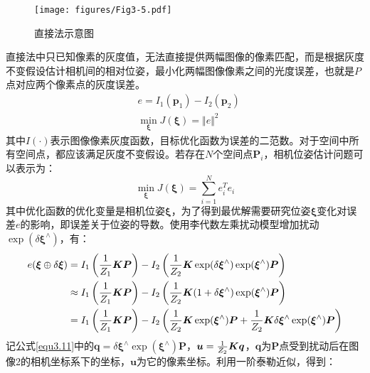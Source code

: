 \begin{figure}
\centering
\texttt{[image: figures/Fig3-5.pdf]}
\caption{直接法示意图}
\label{fig3.5}
\end{figure}

直接法中只已知像素的灰度值，无法直接提供两幅图像的像素匹配，而是根据灰度不变假设估计相机间的相对位姿，最小化两幅图像像素之间的光度误差，也就是$P$点对应两个像素点的灰度误差。
\begin{equation}
\label{equ3.9}
\begin{aligned}
& e = I_1(\boldsymbol{p}_1) - I_2(\boldsymbol{p}_2) 
\\ 
& \min\limits_{\boldsymbol{\xi}} J(\boldsymbol{\xi}) = \Vert e \Vert ^2
\end{aligned}
\end{equation}
其中$I(\cdot)$表示图像像素灰度函数，目标优化函数为误差的二范数。对于空间中所有空间点，都应该满足灰度不变假设。若存在$N$个空间点$\boldsymbol{P}_i$，相机位姿估计问题可以表示为：
\begin{equation}
\label{equ3.10}
\min\limits_{\boldsymbol{\xi}} J(\boldsymbol{\xi}) = \sum\limits_{i=1}^N e_i^T e_i
\end{equation}
其中优化函数的优化变量是相机位姿$\boldsymbol{\xi}$，为了得到最优解需要研究位姿$\boldsymbol{\xi}$变化对误差$e$的影响，即误差关于位姿的导数。使用李代数左乘扰动模型增加扰动$\exp( \delta \boldsymbol{\xi}^{\wedge})$，有：
\begin{equation}
\label{equ3.11}
\begin{aligned}
e(\boldsymbol{\xi}\oplus \delta \boldsymbol{\xi}) & = I_1\left({1 \over Z_1} \boldsymbol{K} \boldsymbol{P} \right) - I_2\left({1 \over Z_2} \boldsymbol{K} \exp (\delta \boldsymbol{\xi}^{\wedge}) \exp (\boldsymbol{\xi}^{\wedge}) \boldsymbol{P} \right)
\\
& \approx I_1\left( {1 \over Z_1} \boldsymbol{K} \boldsymbol{P} \right) - I_2 \left( {1 \over Z_2} \boldsymbol{K} (1+\delta \boldsymbol{\xi}^{\wedge}) \exp (\boldsymbol{\xi}^{\wedge}) \boldsymbol{P} \right)
\\
& = I_1\left( {1 \over Z_1} \boldsymbol{K} \boldsymbol{P} \right) - I_2 \left({1 \over Z_2} \boldsymbol{K} \exp (\boldsymbol{\xi}^{\wedge}) \boldsymbol{P}+ {1 \over Z_2} \boldsymbol{K} \delta \boldsymbol{\xi}^{\wedge} \exp (\boldsymbol{\xi}^{\wedge}) \boldsymbol{P} \right)
\end{aligned}
\end{equation}
记公式\eqref{equ3.11}中的$\boldsymbol{q} = \delta \boldsymbol{\xi}^{\wedge} \exp (\boldsymbol{\xi}^{\wedge}) \boldsymbol{P} $，$\boldsymbol{u}={1 \over Z_2} \boldsymbol{K} \boldsymbol{q}$，$\boldsymbol{q}$为$\boldsymbol{P}$点受到扰动后在图像2的相机坐标系下的坐标，$\boldsymbol{u}$为它的像素坐标。利用一阶泰勒近似，得到：
